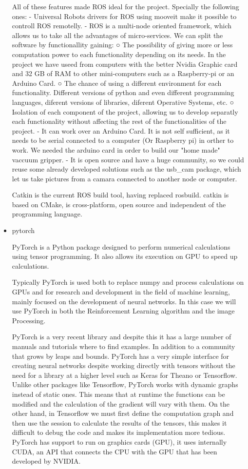 \begin{itemize}
		All of these features made ROS ideal for the project. Specially the following ones:
			- Universal Robots drivers for ROS using mooveit make it possible to controll ROS remotelly.
			- ROS is a multi-node oriented framework, which allows us to take all the advantages of micro-services. We can split the software by functionallity gaining:
				○ The possibility of giving more or less computation power to each functionality depending on its needs. In the project we have useed from  computers with the better Nvidia Graphic card and 32 GB of RAM to other mini-computers such as a Raspberry-pi or an Arduino Card.
				○ The chance of using a different environment for each functionality. Different versions of python and even different programming languages, diferent versions of libraries, diferent Operative Systems, etc.
				○ Isolation of each component of the project, allowing us to develop separatly each functionality without affecting the rest of the functionalities of the project.
			- It can work over an Arduino Card. It is not self sufficient, as it needs to be serial connected to a computer (Or Raspberry pi) in orther to work. We needed the arduino card in order to build our "home made" vaccuum gripper.
			- It is open source and have a huge community, so we could reuse some already developed solutions such as the usb_cam package, which let us take pictures from a camara connected to another node or computer.

		Catkin is the current ROS build tool, having replaced rosbuild. catkin is based on CMake, is cross-platform, open source and independent of the programming language.


	\item[\textendash]pytorch
	
	PyTorch is a Python package designed to perform numerical calculations using tensor programming. It also allows its execution on GPU to speed up calculations.

	Typically PyTorch is used both to replace numpy and process calculations on GPUs and for research and development in the field of machine learning, mainly focused on the development of neural networks. In this case we will use PyTorch in both the Reinforcement Learning algorithm and the image Processing.

	PyTorch is a very recent library and despite this it has a large number of manuals and tutorials where to find examples. In addition to a community that grows by leaps and bounds.
	PyTorch has a very simple interface for creating neural networks despite working directly with tensors without the need for a library at a higher level such as Keras for Theano or Tensorflow.
	Unlike other packages like Tensorflow, PyTorch works with dynamic graphs instead of static ones. This means that at runtime the functions can be modified and the calculation of the gradient will vary with them. On the other hand, in Tensorflow we must first define the computation graph and then use the session to calculate the results of the tensors, this makes it difficult to debug the code and makes its implementation more tedious.
	PyTorch has support to run on graphics cards (GPU), it uses internally CUDA, an API that connects the CPU with the GPU that has been developed by NVIDIA.


\end{itemize}
